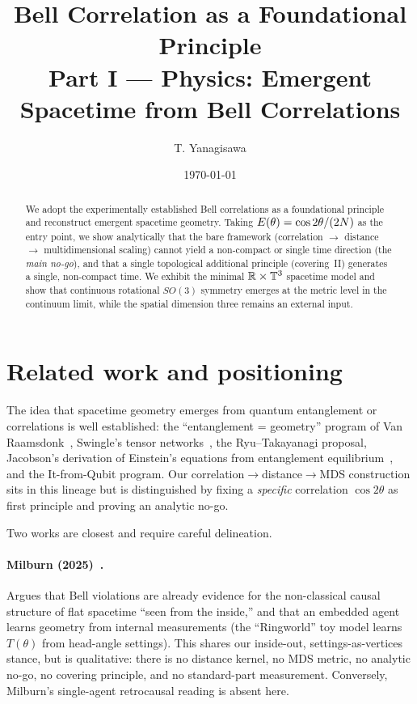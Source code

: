 \documentclass[11pt]{article}
\title{Bell Correlation as a Foundational Principle\\
\large Part I --- Physics: Emergent Spacetime from Bell Correlations}
\author{T. Yanagisawa}
\date{\today}
\begin{document}
\maketitle

\begin{abstract}
We adopt the experimentally established Bell correlations as a foundational
principle and reconstruct emergent spacetime geometry. Taking
$E(\theta)=\cos 2\theta/(2N)$ as the entry point, we show analytically that
the bare framework (correlation $\to$ distance $\to$ multidimensional scaling)
cannot yield a non-compact or single time direction (the \emph{main no-go}), and
that a single topological additional principle (covering~II) generates a single,
non-compact time. We exhibit the minimal $\mathbb{R}\times\mathbb{T}^{3}$ spacetime model and
show that continuous rotational $SO(3)$ symmetry emerges at the metric level in the
continuum limit, while the spatial dimension three remains an external input.
\end{abstract}

\tableofcontents

\section{Related work and positioning}\label{sec:related}
The idea that spacetime geometry emerges from quantum entanglement or correlations
is well established: the ``entanglement = geometry'' program of Van Raamsdonk~\cite{vanraamsdonk},
Swingle's tensor networks~\cite{swingle}, the Ryu--Takayanagi proposal, Jacobson's
derivation of Einstein's equations from entanglement equilibrium~\cite{jacobson}, and
the It-from-Qubit program. Our correlation$\to$distance$\to$MDS construction sits in
this lineage but is distinguished by fixing a \emph{specific} correlation
$\cos2\theta$ as first principle and proving an analytic no-go.

Two works are closest and require careful delineation.

\paragraph{Milburn (2025)~\cite{milburn}.} Argues that Bell violations are already
evidence for the non-classical causal structure of flat spacetime ``seen from the
inside,'' and that an embedded agent learns geometry from internal measurements (the
``Ringworld'' toy model learns $T(\theta)$ from head-angle settings). This shares our
inside-out, settings-as-vertices stance, but is qualitative: there is no
distance kernel, no MDS metric, no analytic no-go, no covering principle, and no
standard-part measurement. Conversely, Milburn's single-agent retrocausal reading is
absent here.
\end{document}
